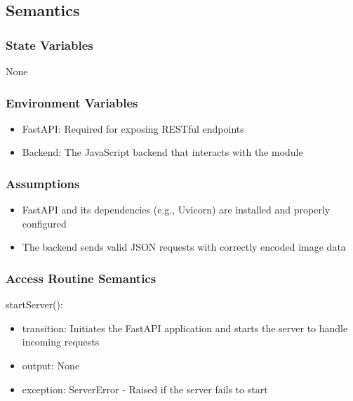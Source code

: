 \documentclass[12pt, titlepage]{article}
\begin{document}
\subsection{Semantics}

\subsubsection{State Variables}
None


\subsubsection{Environment Variables}
\begin{itemize}
  \item FastAPI: Required for exposing RESTful endpoints
  \item Backend: The JavaScript backend that interacts with the module
\end{itemize}

\subsubsection{Assumptions}
\begin{itemize}
  \item FastAPI and its dependencies (e.g., Uvicorn) are installed and properly configured
  \item The backend sends valid JSON requests with correctly encoded image data
\end{itemize}


\subsubsection{Access Routine Semantics}

\noindent startServer():
\begin{itemize}
\item transition: Initiates the FastAPI application and starts the server to handle incoming requests
\item output: None
\item exception: ServerError - Raised if the server fails to start

\end{itemize}
\end{document}
